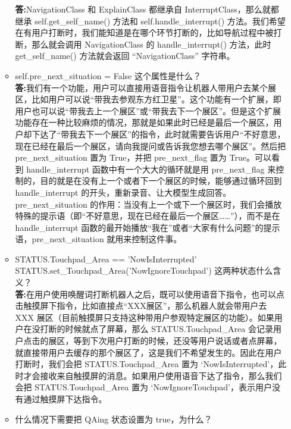 \documentclass[]{article}
\begin{document}
\begin{itemize}
\begin{itemize}
	\textbf{答:}NavigationClass 和 ExplainClass 都继承自 InterruptClass，那么就都继承 self.get\_self\_name() 方法和 self.handle\_interrupt() 方法。我们希望在有用户打断时，我们能知道是在哪个环节打断的，比如导航过程中被打断，那么就会调用 NavigationClass 的 handle\_interrupt() 方法，此时 get\_self\_name() 方法就会返回 “NavigationClass” 字符串。
	
	\item self.pre\_next\_situation = False 这个属性是什么？\\
	
	\textbf{答:}我们有一个功能，用户可以直接用语音指令让机器人带用户去某个展区，比如用户可以说“带我去参观东方红卫星”。这个功能有一个扩展，即用户也可以说“带我去上一个展区”或“带我去下一个展区”。但是这个扩展功能存在一种比较麻烦的情况，那就是如果此时已经是最后一个展区，用户却下达了“带我去下一个展区”的指令，此时就需要告诉用户“不好意思，现在已经在最后一个展区，请向我提问或告诉我您想去哪个展区”。然后把 pre\_next\_situation 置为 True，并把 pre\_next\_flag 置为 True。可以看到 handle\_interrupt 函数中有一个大大的循环就是用 pre\_next\_flag 来控制的，目的就是在没有上一个或者下一个展区的时候，能够通过循环回到 handle\_interrupt 的开头，重新录音、让大模型生成回答。pre\_next\_situation 的作用：当没有上一个或下一个展区时，我们会播放特殊的提示语（即“不好意思，现在已经在最后一个展区……”），而不是在 handle\_interrupt 函数的最开始播放“我在”或者“大家有什么问题”的提示语，pre\_next\_situation 就用来控制这件事。
	
	\item STATUS.Touchpad\_Area == 'NowIsInterrupted'\\
	STATUS.set\_Touchpad\_Area('NowIgnoreTouchpad') 这两种状态什么含义？\\
	
	\textbf{答:}在用户使用唤醒词打断机器人之后，既可以使用语音下指令，也可以点击触摸屏下指令，比如直接点“XXX展区”，那么机器人就会带用户去 XXX 展区（目前触摸屏只支持这种带用户参观特定展区的功能）。如果用户在没打断的时候就点了屏幕，那么 STATUS.Touchpad\_Area 会记录用户点击的展区，等到下次用户打断的时候，还没等用户说话或者点屏幕，就直接带用户去缓存的那个展区了，这是我们不希望发生的。因此在用户打断时，我们会把 STATUS.Touchpad\_Area 置为 ‘NowIsInterrupted’，此时才会接收来自触摸屏的消息。如果用户使用语音下达了指令，那么我们会把 STATUS.Touchpad\_Area 置为 ‘NowIgnoreTouchpad’，表示用户没有通过触摸屏下达指令。
	
	\item 什么情况下需要把 QAing 状态设置为 true，为什么？\\
	

\end{itemize}
\end{itemize}
\end{document}
